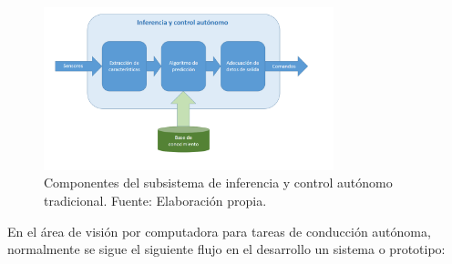\begin{figure}[!h] 
    \centering
    \includegraphics[width=0.75\textwidth]{img/inferencia}
    \caption[Inferencia y control autónomo tradicional]{Componentes del subsistema de inferencia y control autónomo tradicional. Fuente: Elaboración propia.}
    \label{fig:inferencia}
\end{figure}


En el área de visión por computadora para tareas de conducción autónoma, normalmente se sigue el siguiente 
flujo en el desarrollo un sistema o prototipo:

